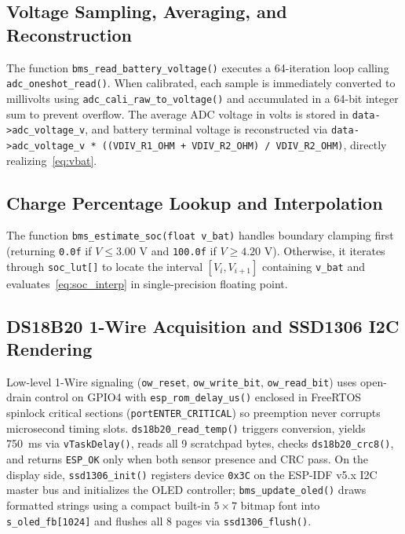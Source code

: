 \documentclass[12pt,a4paper]{article}
\begin{document}
\subsection{Voltage Sampling, Averaging, and Reconstruction}
The function \texttt{bms\_read\_battery\_voltage()} executes a 64-iteration loop calling \texttt{adc\_oneshot\_read()}. When calibrated, each sample is immediately converted to millivolts using \texttt{adc\_cali\_raw\_to\_voltage()} and accumulated in a 64-bit integer sum to prevent overflow. The average ADC voltage in volts is stored in \texttt{data->adc\_voltage\_v}, and battery terminal voltage is reconstructed via \texttt{data->adc\_voltage\_v * ((VDIV\_R1\_OHM + VDIV\_R2\_OHM) / VDIV\_R2\_OHM)}, directly realizing~\eqref{eq:vbat}.

\subsection{Charge Percentage Lookup and Interpolation}
The function \texttt{bms\_estimate\_soc(float v\_bat)} handles boundary clamping first (returning \texttt{0.0f} if $V \le 3.00\text{ V}$ and \texttt{100.0f} if $V \ge 4.20\text{ V}$). Otherwise, it iterates through \texttt{soc\_lut[]} to locate the interval $[V_i, V_{i+1}]$ containing \texttt{v\_bat} and evaluates~\eqref{eq:soc_interp} in single-precision floating point.

\subsection{DS18B20 1-Wire Acquisition and SSD1306 I2C Rendering}
Low-level 1-Wire signaling (\texttt{ow\_reset}, \texttt{ow\_write\_bit}, \texttt{ow\_read\_bit}) uses open-drain control on GPIO4 with \texttt{esp\_rom\_delay\_us()} enclosed in FreeRTOS spinlock critical sections (\texttt{portENTER\_CRITICAL}) so preemption never corrupts microsecond timing slots. \texttt{ds18b20\_read\_temp()} triggers conversion, yields 750~ms via \texttt{vTaskDelay()}, reads all 9 scratchpad bytes, checks \texttt{ds18b20\_crc8()}, and returns \texttt{ESP\_OK} only when both sensor presence and CRC pass. On the display side, \texttt{ssd1306\_init()} registers device \texttt{0x3C} on the ESP-IDF v5.x I2C master bus and initializes the OLED controller; \texttt{bms\_update\_oled()} draws formatted strings using a compact built-in $5 \times 7$ bitmap font into \texttt{s\_oled\_fb[1024]} and flushes all 8 pages via \texttt{ssd1306\_flush()}.
\end{document}
